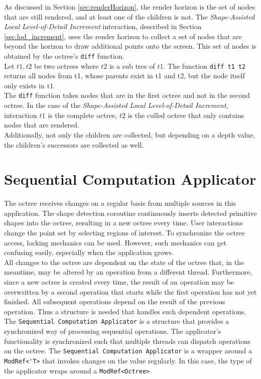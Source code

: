 As discussed in Section \ref{sec:renderHorizon}, the render horizon is the set of nodes that are still rendered, and at least one of the children is not. The \textit{Shape-Assisted Local Level-of-Detail Increment} interaction, described in Section \ref{sec:lod_increment}, uses the render horizon to collect a set of nodes that are beyond the horizon to draw additional points onto the screen. This set of nodes is obtained by the octree's \verb|diff| function. 
\\
Let $t1, t2$ be two octrees where $t2$ is a sub tree of $t1$. The function \verb|diff t1 t2| returns all nodes from t1, whose parents exist in t1 and t2, but the node itself only exists in t1.
\\
The \verb|diff| function takes nodes that are in the first octree and not in the second octree. In the case of the \textit{Shape-Assisted Local Level-of-Detail Increment}, interaction $t1$ is the complete octree, $t2$ is the culled octree that only contains nodes that are rendered. 
\\
Additionally, not only the children are collected, but depending on a depth value, the children's successors are collected as well. 


\section{Sequential Computation Applicator}

The octree receives changes on a regular basis from multiple sources in this application. The shape detection coroutine continuously inserts detected primitive shapes into the octree, resulting in a new octree every time. User interactions change the point set by selecting regions of interest. To synchronize the octree access, locking mechanics can be used. However, such mechanics can get confusing easily, especially when the application grows. 
\\
All changes to the octree are dependent on the state of the octree that, in the meantime, may be altered by an operation from a different thread. Furthermore, since a new octree is created every time, the result of an operation may be overwritten by a second operation that starts while the first operation has not yet finished. All subsequent operations depend on the result of the previous operation. Thus a structure is needed that handles such dependent operations. 
\\
The \verb|Sequential Computation Applicator| is a structure that provides a synchronized way of processing sequential operations. The applicator's functionality is synchronized such that multiple threads can dispatch operations on the octree. The \verb|Sequential Computation Applicator| is a wrapper around a \verb|ModRef<'T>| that invokes changes on the value regularly. 
In this case, the type of the applicator wraps around a \verb|ModRef<Octree>|. 

